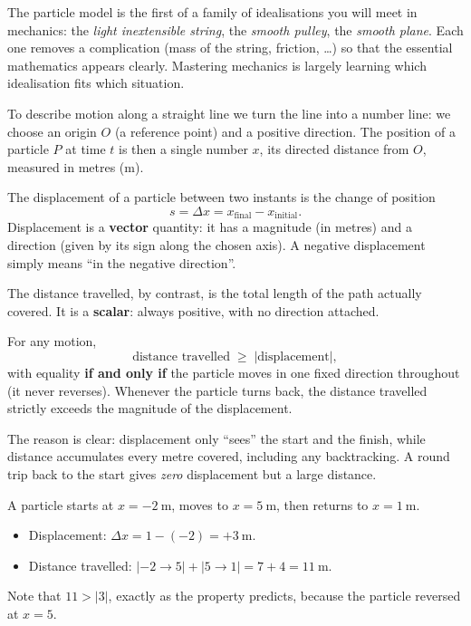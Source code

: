 \documentclass[11pt]{article}
\newcommand{\cle}[1]{{\popxbold\color{popdark}#1}}
\newcounter{popsec}
\newcounter{popsub}
\newcommand{\courssub}[1]{%
  \stepcounter{popsub}%
  \par\vspace{9pt}\noindent{\popxbold\fontsize{11.5}{13}\selectfont\color{popink}{\color{poporange}\thepopsec.\thepopsub}\hspace{6pt}#1}\par\nopagebreak\vspace{4pt}
}
\begin{document}
\begin{savaistu}
The particle model is the first of a family of idealisations you will meet in mechanics: the \emph{light inextensible string}, the \emph{smooth pulley}, the \emph{smooth plane}. Each one removes a complication (mass of the string, friction, \dots) so that the essential mathematics appears clearly. Mastering mechanics is largely learning which idealisation fits which situation.
\end{savaistu}

\courssub{Position and Displacement}

To describe motion along a straight line we turn the line into a number line: we choose an \cle{origin} $O$ (a reference point) and a \cle{positive direction}. The \cle{position} of a particle $P$ at time $t$ is then a single number $x$, its directed distance from $O$, measured in metres ($\mathrm{m}$).

\begin{definition}[Displacement]
The \cle{displacement} of a particle between two instants is the change of position
\[
s = \Delta x = x_{\text{final}} - x_{\text{initial}} .
\]
Displacement is a \textbf{vector} quantity: it has a magnitude (in metres) and a direction (given by its sign along the chosen axis). A negative displacement simply means ``in the negative direction''.
\end{definition}

The \cle{distance} travelled, by contrast, is the total length of the path actually covered. It is a \textbf{scalar}: always positive, with no direction attached.

\begin{propriete}
For any motion,
\[
\text{distance travelled} \;\geq\; |\text{displacement}|,
\]
with equality \textbf{if and only if} the particle moves in one fixed direction throughout (it never reverses). Whenever the particle turns back, the distance travelled strictly exceeds the magnitude of the displacement.
\end{propriete}

The reason is clear: displacement only ``sees'' the start and the finish, while distance accumulates every metre covered, including any backtracking. A round trip back to the start gives \emph{zero} displacement but a large distance.

\begin{exemplebox}
A particle starts at $x = -2\ \mathrm{m}$, moves to $x = 5\ \mathrm{m}$, then returns to $x = 1\ \mathrm{m}$.
\begin{itemize}
\item Displacement: $\Delta x = 1 - (-2) = +3\ \mathrm{m}$.
\item Distance travelled: $|-2 \to 5| + |5 \to 1| = 7 + 4 = 11\ \mathrm{m}$.
\end{itemize}
Note that $11 > |3|$, exactly as the property predicts, because the particle reversed at $x = 5$.
\end{exemplebox}
\end{document}
